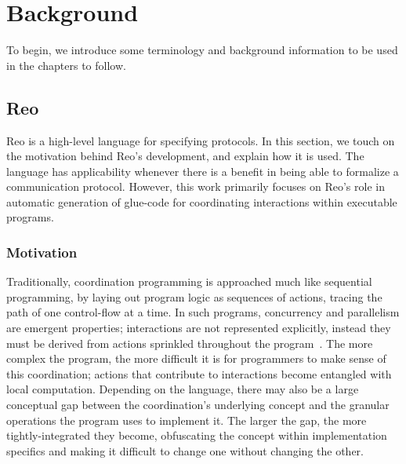 
\chapter{Background}
\label{sec:background}
To begin, we introduce some terminology and background information to be used in the chapters to follow.

\section{Reo}
\label{sec:reo_background}
Reo is a high-level language for specifying protocols. In this section, we touch on the motivation behind Reo's development, and explain how it is used. The language has applicability whenever there is a benefit in being able to formalize a communication protocol. However, this work primarily focuses on Reo's role in automatic generation of glue-code for coordinating interactions within executable programs.  

\subsection{Motivation}
\label{sec:reo_motivation}
Traditionally, coordination programming is approached much like sequential programming, by laying out program logic as sequences of actions, tracing the path of one control-flow at a time. In such programs, concurrency and parallelism are emergent properties; interactions are not represented explicitly, instead they must be derived from actions sprinkled throughout the program~\cite{arbab2011puff}. The more complex the program, the more difficult it is for programmers to make sense of this coordination; actions that contribute to interactions become entangled with local computation. Depending on the language, there may also be a large conceptual gap between the coordination's underlying concept and the granular operations the program uses to implement it. The larger the gap, the more tightly-integrated they become, obfuscating the concept within implementation specifics and making it difficult to change one without changing the other.


